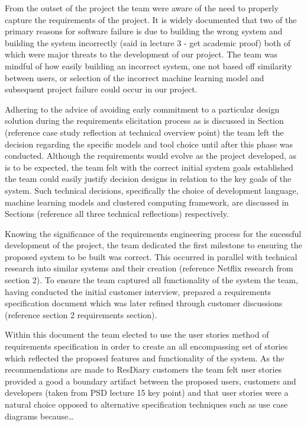 \documentclass{l3proj}
\begin{document}


From the outset of the project the team were aware of the need to properly capture the requirements of the project. It is widely documented that two of the primary reasons for software failure is due to building the wrong system and building the system incorrectly (said in lecture 3 - get academic proof) both of which were major threats to the development of our project. The team was mindful of how easily building an incorrect system, one not based off similarity between users, or selection of the incorrect machine learning model and subsequent project failure could occur in our project. 

Adhering to the advice of avoiding early commitment to a particular design solution during the requirements elicitation process as is discussed in Section (reference case study reflection at technical overview point) the team left the decision regarding the specific models and tool choice until after this phase was conducted. Although the requirements would evolve as the project developed, as is to be expected, the team felt with the correct initial system goals established the team could easily justify decision designs in relation to the key goals of the system. Such technical decisions, specifically the choice of development language, machine learning models and clustered computing framework, are discussed in Sections (reference all three technical reflections) respectively. 

Knowing the significance of the requirements engineering process for the sucessful development of the project, the team dedicated the first milestone to ensuring the proposed system to be built was correct. This occurred in parallel with technical research into similar systems and their creation (reference Netflix research from section 2). To ensure the team captured all functionality of the system the team, having conducted the initial customer interview, prepared a requirements specification document which was later refined through customer discussions (reference section 2 requirements section). 

Within this document the team elected to use the user stories method of requirements specification in order to create an all encompassing set of stories which reflected the proposed features and functionality of the system. As the recommendations are made to ResDiary customers the team felt user stories provided a good a boundary artifact between the proposed users, customers and developers (taken from PSD lecture 15 key point) and that user stories were a natural choice opposed to alternative specification techniques such as use case diagrams because… 
\end{document}

